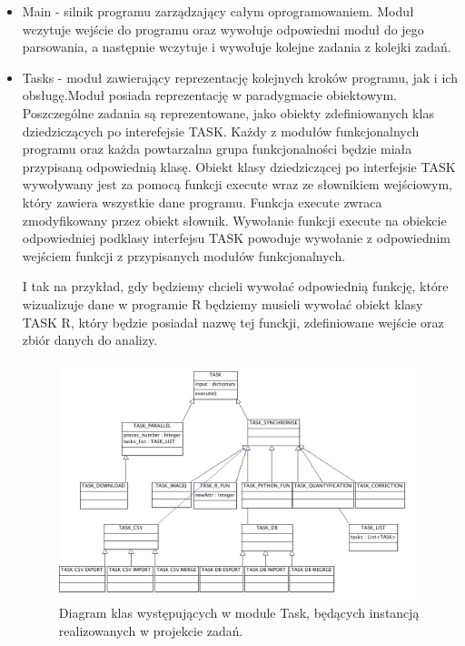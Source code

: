 \begin{itemize}
\item Main - silnik programu zarządzający całym oprogramowaniem. Moduł wczytuje wejście do programu oraz wywołuje odpowiedni moduł do jego parsowania, a następnie wczytuje i wywołuje kolejne zadania z kolejki zadań.
\item Tasks - moduł zawierający reprezentację kolejnych kroków programu, jak i ich obsługę.Moduł posiada reprezentację w paradygmacie obiektowym.
Poszczególne zadania są reprezentowane, jako obiekty  zdefiniowanych klas dziedziczących po interefejsie TASK. 
Każdy z modułów funkcjonalnych programu oraz każda powtarzalna grupa funkcjonalności będzie miała przypisaną odpowiednią klasę.
Obiekt klasy dziedziczącej po interfejsie TASK wywoływany jest za pomocą funkcji execute wraz ze słownikiem wejściowym, który zawiera wszystkie dane programu. Funkcja execute zwraca zmodyfikowany przez obiekt słownik.
Wywołanie funkcji execute na obiekcie odpowiedniej podklasy interfejsu TASK powoduje wywołanie z odpowiednim wejściem funkcji z przypisanych modułów funkcjonalnych.

I tak na przykład, gdy będziemy chcieli wywołać odpowiednią funkcję, które wizualizuje dane w programie R będziemy musieli wywołać obiekt klasy TASK R, który będzie posiadał nazwę tej funckji, zdefiniowane wejście oraz zbiór danych do analizy.

\begin{figure}[htp]
  \begin{center}
    \includegraphics[width=0.8\linewidth]{resources/img/Tasks.png}
  \caption{Diagram klas występujących w module Task, będących instancją realizowanych w projekcie zadań.} 
  \label{fig:modules}
  \end{center}
\end{figure}


\end{itemize}
